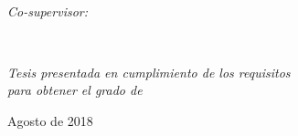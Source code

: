 \documentclass[
12pt, %
spanish, %
singlespacing, %
headsepline, %
]{MastersDoctoralThesis} %
\theoremstyle{plain}
\theoremstyle{definition}
\begin{document}
\begin{titlepage}
\begin{center}
\begin{minipage}[t]{0.4\textwidth}
\begin{flushright}
\end{flushright}
\end{minipage}\\[0.7cm]

\begin{minipage}[t]{\textwidth}
\begin{center} \large
	\emph{Co-supervisor:} \\ 
	\href{http://portilla-flores.com.mx/}{\supnameII} %
	\centering 
	
\end{center}
\end{minipage}\\[2.3cm]
 
\vfill

\large \textit{Tesis presentada en cumplimiento de los requisitos \\ para obtener el grado de \degreename}\\[0.3cm] %
 
\vfill


Agosto de 2018

 

\end{center}
\end{titlepage}

%

 
 
\end{document}
